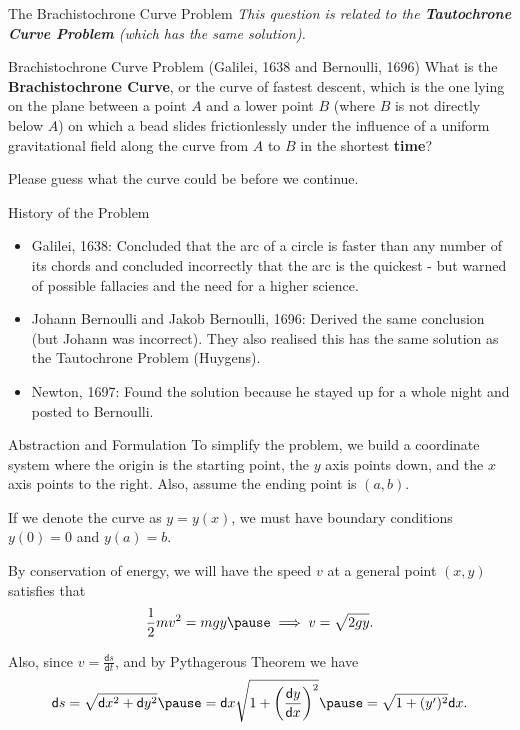\documentclass{beamer}
\newcommand{\diff}{\mathsf{d}}
\begin{document}
\begin{frame}{The Brachistochrone Curve Problem} \pause
    \textit{This question is related to the \textbf{Tautochrone Curve Problem} (which has the same solution).} \pause

    \begin{block}{Brachistochrone Curve Problem (Galilei, 1638 and Bernoulli, 1696)}
        What is the \textbf{Brachistochrone Curve}, or the curve of fastest descent, which is the one lying on the plane between a point \(A\) and a lower point \(B\) (where \(B\) is not directly below \(A\)) on which a bead slides frictionlessly under the influence of a uniform gravitational field along the curve from \(A\) to \(B\) in the shortest \textbf{time}?
    \end{block} \pause

    Please guess what the curve could be before we continue.
\end{frame}

\begin{frame}{History of the Problem}
    \begin{itemize}
        \item Galilei, 1638: Concluded that the arc of a circle is faster than any number of its chords and concluded incorrectly that the arc is the quickest \pause - but warned of possible fallacies and the need for a higher science. \pause
        \item Johann Bernoulli and Jakob Bernoulli, 1696: Derived the same conclusion (but Johann was incorrect). \pause They also realised this has the same solution as the Tautochrone Problem (Huygens). \pause
        \item Newton, 1697: Found the solution because he stayed up for a whole night and posted to Bernoulli.
    \end{itemize}
\end{frame}

\begin{frame}{Abstraction and Formulation} \pause
    To simplify the problem, we build a coordinate system where the origin is the starting point, the \(y\) axis points down, and the \(x\) axis points to the right. \pause Also, assume the ending point is \((a, b)\). \pause

    If we denote the curve as \(y = y(x)\), we must have boundary conditions \(y(0) = 0\) and \(y(a) = b\). \pause

    By conservation of energy, \pause we will have the speed \(v\) at a general point \((x, y)\) satisfies that
    \[
        \frac{1}{2}mv^2 = mgy \pause \implies v = \sqrt{2gy}.
    \] \pause

    Also, since \(v = \frac{\diff s}{\diff t}\), and by Pythagerous Theorem we have
    \[
        \diff s = \sqrt{\diff x^2 + \diff y^2} \pause = \diff x \sqrt{1 + \left(\frac{\diff y}{\diff x}\right)^2} \pause = \sqrt{1 + (y')^2} \diff x.
    \]
\end{frame}
\end{document}
